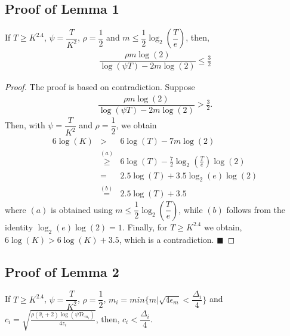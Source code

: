 
\subsection{Proof of Lemma 1} \label{App:Lemma:1}

\begin{lemma}
If $T\geq K^{2.4}$, $\psi=\dfrac{T}{ K^2}$, $\rho=\dfrac{1}{2}$ and $m\leq \dfrac{1}{2} \log_2\left(\dfrac{T}{e}\right) $, then,
\begin{align*}
\dfrac{\rho m \log(2)}{\log(\psi T) - 2m\log( 2)} \leq \frac{3}{2}
\end{align*}
\end{lemma}

\begin{proof}
The proof is based on contradiction. Suppose
\begin{eqnarray*}
\dfrac{\rho m \log(2)}{\log(\psi T) - 2m\log( 2)} > \frac{3}{2}.
\end{eqnarray*}
Then, with $\psi=\dfrac{T}{ K^2}$ and $\rho=\dfrac{1}{2}$, we obtain
\begin{eqnarray*}
6\log(K) 
&>& 6\log(T) - 7m\log(2) \\
&\overset{(a)}{\ge}& 6\log(T) - \frac{7}{2} \log_2\left(\frac{T}{e}\right) \log(2) \\
&=& 2.5\log(T) + 3.5 \log_2(e)\log(2)  \\
&\overset{(b)}{=}& 2.5\log(T) +3.5
\end{eqnarray*}
where $(a)$ is obtained using $m\leq \dfrac{1}{2} \log_2\left(\dfrac{T}{e}\right)$, while $(b)$ follows from the identity $\log_2(e)\log(2) =1$. Finally, for $T\ge K^{2.4}$ we obtain, $6\log(K)>6\log(K)+3.5$, which is a contradiction.
\hfill $\blacksquare$	
\end{proof}

\subsection{Proof of Lemma 2}
\label{App:Lemma:2}
\begin{lemma}
If $T\geq K^{2.4}$, $\psi=\dfrac{T}{ K^2}$, $\rho =\dfrac{1}{2}$, $m_i = min\lbrace m|\sqrt{4\epsilon_{m} } < \dfrac{\Delta_i}{4} \rbrace $ and $c_{i} =\sqrt{\frac{\rho (\hat{v}_i + 2)\log (\psi T\epsilon_{m_{i}})}{4 z_i}}$, then, $c_{i} < \dfrac{\Delta_i}{4}$.
\end{lemma}

